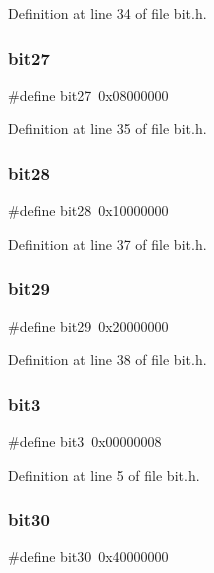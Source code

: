Definition at line 34 of file bit.\+h.

\mbox{\label{bit_8h_aee8869ce6f7a182feea2d9537cf17847}} 
\subsubsection{bit27}
{\footnotesize\ttfamily \#define bit27~0x08000000}



Definition at line 35 of file bit.\+h.

\mbox{\label{bit_8h_ad53f96a02aa89945aea8c064de77e5a5}} 
\subsubsection{bit28}
{\footnotesize\ttfamily \#define bit28~0x10000000}



Definition at line 37 of file bit.\+h.

\mbox{\label{bit_8h_a4b32f0febdb3ccab3729ddc642cb7181}} 
\subsubsection{bit29}
{\footnotesize\ttfamily \#define bit29~0x20000000}



Definition at line 38 of file bit.\+h.

\mbox{\label{bit_8h_a620d630bc8a2dc6eb43b926506f62957}} 
\subsubsection{bit3}
{\footnotesize\ttfamily \#define bit3~0x00000008}



Definition at line 5 of file bit.\+h.

\mbox{\label{bit_8h_a3802e6276a40396555269816d182eb87}} 
\subsubsection{bit30}
{\footnotesize\ttfamily \#define bit30~0x40000000}



